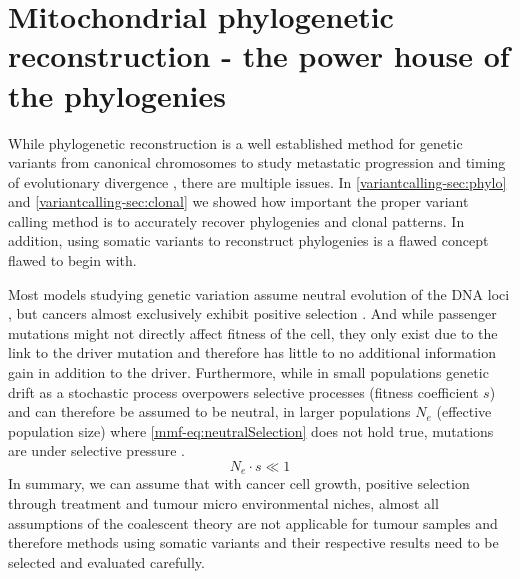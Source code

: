 \section[Mitochondrial phylogenetic reconstruction]{Mitochondrial phylogenetic reconstruction - the power house of the phylogenies}
\label{cascade-sec:mitochondria}

While phylogenetic reconstruction is a well established method for genetic variants from canonical chromosomes to study metastatic progression and timing of evolutionary divergence \cite{Deshwar2015,Brown2017,Hu2019}, there are multiple issues. In \autoref{variantcalling-sec:phylo} and \autoref{variantcalling-sec:clonal} we showed how important the proper variant calling method is to accurately recover phylogenies and clonal patterns. In addition, using somatic variants to reconstruct phylogenies is a flawed concept flawed to begin with. 

Most models studying genetic variation assume neutral evolution of the DNA loci \cite{Kimura1968,Lynch1989}, but cancers almost exclusively exhibit positive selection \cite{Cannataro2018}. And while passenger mutations might not directly affect fitness of the cell, they only exist due to the link to the driver mutation and therefore has little to no additional information gain in addition to the driver. Furthermore, while in small populations genetic drift as a stochastic process overpowers selective processes (fitness coefficient $s$) and can therefore be assumed to be neutral, in larger populations $N_e$ (effective population size) where \autoref{mmf-eq:neutralSelection} does not hold true, mutations are under selective pressure \cite{EyreWalker2007}.
\begin{equation}
N_e \cdot s \ll 1 \label{mmf-eq:neutralSelection}
\end{equation}
\myequation[\ref{mmf-eq:neutralSelection}]{Selective pressure with effective population size}
\vspace{-3em}
In summary, we can assume that with cancer cell growth, positive selection through treatment and tumour micro environmental niches, almost all assumptions of the coalescent theory \cite{Kingman1982} are not applicable for tumour samples and therefore methods using somatic variants and their respective results need to be selected and evaluated carefully.

